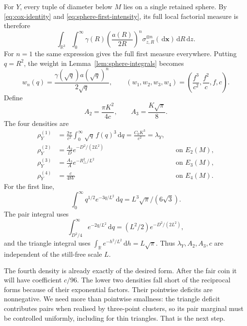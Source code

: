 \documentclass[11pt,a4paper]{article}
\numberwithin{equation}{section}
\theoremstyle{definition}
\theoremstyle{remark}
\newcommand{\R}{\mathbb R}
\newcommand{\dd}{\,\mathrm d}
\begin{document}
For $Y$, every tuple of diameter below $M$ lies on a single retained
sphere. By \eqref{eq:cox-identity} and
\eqref{eq:sphere-first-intensity}, its full local factorial measure is
therefore
\begin{equation}
 \int_{\R^3}\int_0^\infty
 \gamma(R)\left(\frac{a(R)}{2R}\right)^n
       \sigma_{z,R}^{\otimes n}(\dd\mathbf x)\dd R\dd z.
 \label{eq:local-sphere-measure}
\end{equation}
For $n=1$ the same expression gives the full first measure everywhere.
Putting $q=R^2$, the weight in Lemma~\ref{lem:sphere-integrals} becomes
\begin{equation}
 w_n(q)=\frac{\gamma(\sqrt q)a(\sqrt q)^n}{2\sqrt q},
 \qquad (w_1,w_2,w_3,w_4)=\left(\frac{f^3}{c^2},\frac{f^2}{c},f,c\right).
 \label{eq:wn}
\end{equation}
Define
\begin{equation}
 A_2=\frac{\pi K^2}{4c},\qquad A_3=\frac{K\sqrt\pi}{8}.
 \label{eq:A2A3}
\end{equation}
The four densities are
\begin{align}
 \rho_Y^{(1)}&=\frac{2\pi}{c^2}\int_0^\infty\sqrt q\,f(q)^3\dd q
              =\frac{C_0K^3}{c^2}=\lambda_Y,
              \label{eq:Y1}\\
 \rho_Y^{(2)}&=\frac{A_2}{D}e^{-D^2/(2L^2)}
                         &&\text{on }E_2(M),\label{eq:Y2}\\
 \rho_Y^{(3)}&=\frac{A_3}{A}e^{-R_\triangle^2/L^2}
                         &&\text{on }E_3(M),\label{eq:Y3}\\
 \rho_Y^{(4)}&=\frac{c}{48V}
                         &&\text{on }E_4(M).\label{eq:Y4}
\end{align}
For the first line,
\[
 \int_0^\infty q^{1/2}e^{-3q/L^2}\dd q
 =L^3\sqrt\pi/(6\sqrt3).
\]
The pair integral uses
\[
 \int_{D^2/4}^\infty e^{-2q/L^2}\dd q
 =(L^2/2)e^{-D^2/(2L^2)},
\]
and the triangle integral uses
$\int_\R e^{-h^2/L^2}\dd h=L\sqrt\pi$.
Thus $\lambda_Y,A_2,A_3,c$ are independent of the still-free scale $L$.

The fourth density is already exactly of the desired form. After the
fair coin it will have coefficient $c/96$. The lower two densities fall
short of the reciprocal forms because of their exponential factors.
Their pointwise deficits are nonnegative. We need more than pointwise
smallness: the triangle deficit contributes pairs when realised by
three-point clusters, so its pair marginal must be controlled uniformly,
including for thin triangles. That is the next step.
\end{document}
